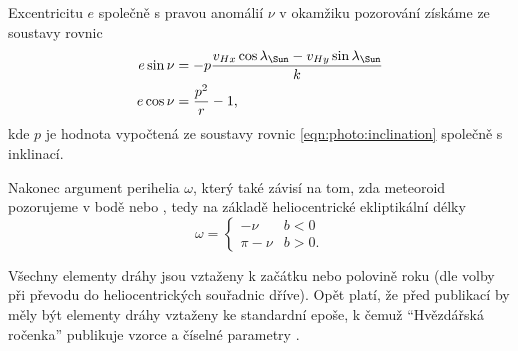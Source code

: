 Excentricitu $e$ společně s pravou anomálií $\nu$ v okamžiku pozorování získáme ze soustavy rovnic \cite{ceplecha}
\begin{equation}
    \begin{aligned}
        e\sin{\nu}&=-p\frac{v_{Hx}\cos{\lambda_\text{\Sun}}-v_{Hy}\sin{\lambda_\text{\Sun}}}{k}\\
        e\cos{\nu}&=\frac{p^2}{r}-1\text{,}
    \end{aligned}
\end{equation}
kde $p$ je hodnota vypočtená ze soustavy rovnic \eqref{eqn:photo:inclination} společně s inklinací.

Nakonec argument perihelia $\omega$, který také závisí na tom, zda meteoroid pozorujeme v bodě {\NorthNode} nebo {\SouthNode}, tedy na základě heliocentrické ekliptikální délky \cite{ceplecha}
\begin{equation}
    \omega=\begin{cases}
        -\nu&b<0\\
        \pi-\nu&b>0 \text{.}
    \end{cases}
\end{equation}

\smallskip

Všechny elementy dráhy jsou vztaženy k začátku nebo polovině roku (dle volby při převodu do heliocentrických souřadnic dříve). Opět platí, že před publikací by měly být elementy dráhy vztaženy ke standardní epoše, k čemuž "`Hvězdářská ročenka"' publikuje vzorce a číselné parametry \cite{ceplecha}.
